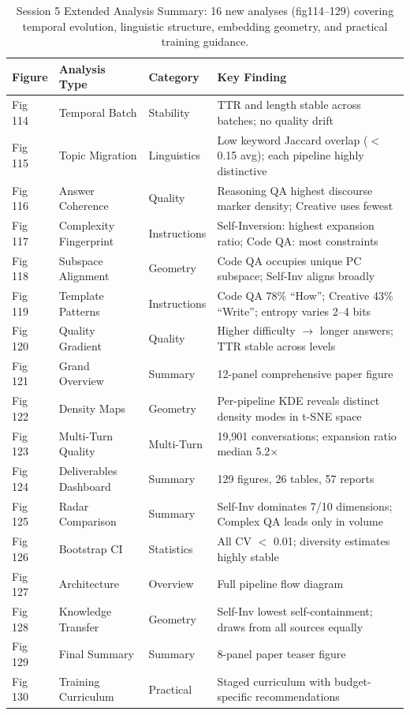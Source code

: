 \begin{table}[t]
\centering
\caption{Session 5 Extended Analysis Summary: 16 new analyses (fig114--129) covering temporal evolution, linguistic structure, embedding geometry, and practical training guidance.}
\label{tab:session5}
\small
\begin{tabular}{lllp{6cm}}
\toprule
\textbf{Figure} & \textbf{Analysis Type} & \textbf{Category} & \textbf{Key Finding} \\
\midrule
Fig 114 & Temporal Batch & Stability & TTR and length stable across batches; no quality drift \\
Fig 115 & Topic Migration & Linguistics & Low keyword Jaccard overlap ($<$0.15 avg); each pipeline highly distinctive \\
Fig 116 & Answer Coherence & Quality & Reasoning QA highest discourse marker density; Creative uses fewest \\
Fig 117 & Complexity Fingerprint & Instructions & Self-Inversion: highest expansion ratio; Code QA: most constraints \\
Fig 118 & Subspace Alignment & Geometry & Code QA occupies unique PC subspace; Self-Inv aligns broadly \\
Fig 119 & Template Patterns & Instructions & Code QA 78\% ``How''; Creative 43\% ``Write''; entropy varies 2--4 bits \\
Fig 120 & Quality Gradient & Quality & Higher difficulty $\to$ longer answers; TTR stable across levels \\
Fig 121 & Grand Overview & Summary & 12-panel comprehensive paper figure \\
Fig 122 & Density Maps & Geometry & Per-pipeline KDE reveals distinct density modes in t-SNE space \\
Fig 123 & Multi-Turn Quality & Multi-Turn & 19,901 conversations; expansion ratio median 5.2$\times$ \\
Fig 124 & Deliverables Dashboard & Summary & 129 figures, 26 tables, 57 reports \\
Fig 125 & Radar Comparison & Summary & Self-Inv dominates 7/10 dimensions; Complex QA leads only in volume \\
Fig 126 & Bootstrap CI & Statistics & All CV $<$ 0.01; diversity estimates highly stable \\
Fig 127 & Architecture & Overview & Full pipeline flow diagram \\
Fig 128 & Knowledge Transfer & Geometry & Self-Inv lowest self-containment; draws from all sources equally \\
Fig 129 & Final Summary & Summary & 8-panel paper teaser figure \\
Fig 130 & Training Curriculum & Practical & Staged curriculum with budget-specific recommendations \\
\bottomrule
\end{tabular}
\end{table}

